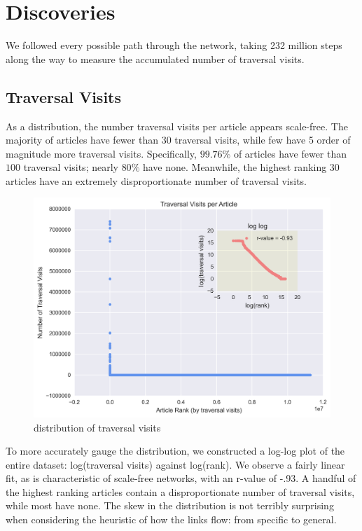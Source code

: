 \documentclass[twoside]{article}
\begin{document}
\section{Discoveries}

We followed every possible path through the network, taking 232 million steps along the way to measure the accumulated number of traversal visits.

\subsection{Traversal Visits}

As a distribution, the number traversal visits per article appears scale-free. The majority of articles have fewer than 30 traversal visits, while few 
have 5 order of magnitude more traversal visits. 
Specifically, $99.76\%$ of articles have fewer than $100$ traversal visits; nearly $80\%$ have none. 
Meanwhile, the highest ranking 30 articles have an extremely disproportionate number of traversal visits.

\begin{figure}[H]
\centering
    \caption{distribution of traversal visits}
        \includegraphics[width=\textwidth]{graphics/traversals_per_article.png}
\end{figure}

To more accurately gauge the distribution, we constructed a log-log plot of the entire dataset: log(traversal visits) against log(rank). We observe a fairly linear fit, as is characteristic of scale-free networks, with an r-value of -.93. A handful of the highest ranking articles contain a disproportionate number of traversal visits, while most have none. The skew in the distribution is not terribly surprising when considering the heuristic of how the links flow: from specific to general. 
\end{document}
